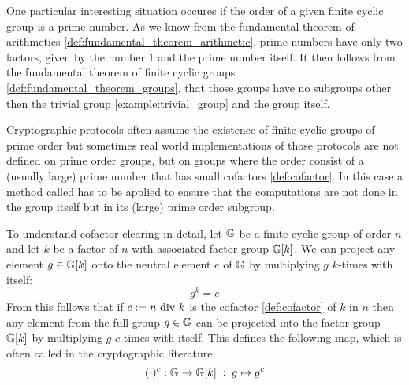 One particular interesting situation occures if the order of a given finite cyclic group is a prime number. As we know from the fundamental theorem of arithmetics \ref{def:fundamental_theorem_arithmetic}, prime numbers have only two factors, given by the number $1$ and the prime number itself. It then follows from the fundamental theorem of finite cyclic groups \ref{def:fundamental_theorem_groups}, that those groups have no subgroups other then the trivial group \ref{example:trivial_group} and the group itself.

Cryptographic protocols often assume the existence of finite cyclic groups of prime order but sometimes real world implementations of those protocols are not defined on prime order groups, but on groups where the order consist of a (usually large) prime number that has small cofactors \ref{def:cofactor}. In this case a method called  has to be applied to ensure that the computations are not done in the group itself but in its (large) prime order subgroup.

To understand cofactor clearing in detail, let $\mathbb{G}$ be a finite cyclic group of order $n$ and let $k$ be a factor of $n$ with associated factor group $\mathbb{G}[k]$. We can project any element $g\in\mathbb{G}[k]$ onto the neutral element $e$ of $\mathbb{G}$ by multiplying $g$ $k$-times with itself:
\begin{equation}
g^k = e
\end{equation}
From this follows that if $c:=n \text{ div } k$ is the cofactor \ref{def:cofactor} of $k$ in $n$ then any element from the full group $g\in \mathbb{G}$ can be projected into the factor group $\mathbb{G}[k]$ by multiplying $g$ $c$-times with itself. This defines the following map, which is often called  in the cryptographic literature:
\begin{equation}
\label{def:cofactor_clearing}
(\cdot)^c: \mathbb{G} \to \mathbb{G}[k]\; : \; g \mapsto g^c
\end{equation}

